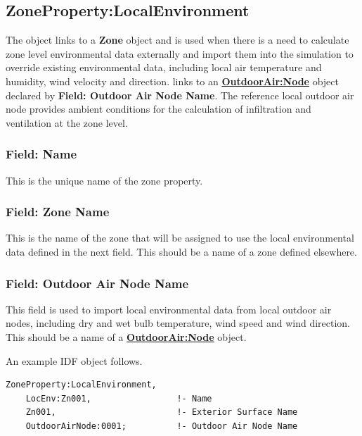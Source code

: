 \subsection{ZoneProperty:LocalEnvironment}\label{ZonePropertylocalEnvironment}

The object links to a \textbf{Zone} object and is used when there is a need to calculate zone level environmental data externally and import them into the simulation to override existing environmental data, including local air temperature and humidity, wind velocity and direction. links to an \textbf{\hyperref[outdoorairnode]{OutdoorAir:Node}} object declared by \textbf{Field: Outdoor Air Node Name}. The reference local outdoor air node provides ambient conditions for the calculation of infiltration and ventilation at the zone level.

\subsubsection{Field: Name}\label{field-zone-localenv-name}

This is the unique name of the zone property.

\subsubsection{Field: Zone Name}\label{ZonePropertylocalEnvironment-field-zone-name}

This is the name of the zone that will be assigned to use the local environmental data defined in the next field. This should be a name of a zone defined elsewhere.

\subsubsection{Field: Outdoor Air Node Name}\label{field-zone-outdoor-air-node-name}

This field is used to import local environmental data from local outdoor air nodes, including dry and wet bulb temperature, wind speed and wind direction. This should be a name of a \textbf{\hyperref[outdoorairnode]{OutdoorAir:Node}} object.

An example IDF object follows.

\begin{lstlisting}
ZoneProperty:LocalEnvironment,
    LocEnv:Zn001,                 !- Name
    Zn001,                        !- Exterior Surface Name
    OutdoorAirNode:0001;          !- Outdoor Air Node Name
\end{lstlisting}

